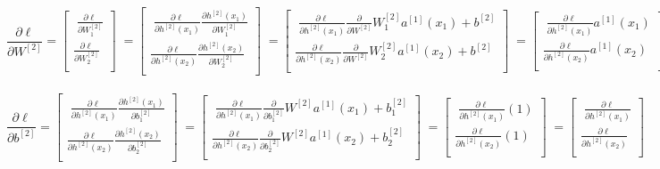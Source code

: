 \documentclass{article}
\begin{document}
\begin{itemize}
{$$
\frac{\partial \ell}{\partial W^{[2]}} = 
\begin{bmatrix} \;
\frac{\partial \ell}{\partial W_{1}^{[2]}} \\
\frac{\partial \ell}{\partial W_{2}^{[2]}} \\
\end{bmatrix} \;
= 
\begin{bmatrix} \;
\frac{\partial \ell}{\partial h^{[2]}(x_1)} \frac{\partial h^{[2]}(x_1)}{\partial W_{1}^{[2]}} \\
\frac{\partial \ell}{\partial h^{[2]}(x_2)} \frac{\partial h^{[2]}(x_2)}{\partial W_{2}^{[2]}} \\
\end{bmatrix} \;
= 
\begin{bmatrix} \;
\frac{\partial \ell}{\partial h^{[2]}(x_1)} \frac{\partial}{\partial W^{[2]}} W_{1}^{[2]}a^{[1]}(x_1) + b^{[2]} \\
\frac{\partial \ell}{\partial h^{[2]}(x_2)} \frac{\partial}{\partial W^{[2]}} W_{2}^{[2]}a^{[1]}(x_2) + b^{[2]} \\
\end{bmatrix} \;
= 
\begin{bmatrix} \;
\frac{\partial \ell}{\partial h^{[2]}(x_1)} a^{[1]}(x_1) \\
\frac{\partial \ell}{\partial h^{[2]}(x_2)} a^{[1]}(x_2) \\
\end{bmatrix} \;
$$
\\
$$
\frac{\partial \ell}{\partial b^{[2]}}
=
\begin{bmatrix} \;
\frac{\partial \ell}{\partial h^{[2]}(x_1)} \frac{\partial h^{[2]}(x_1)}{\partial b_1^{[2]}} \\
\frac{\partial \ell}{\partial h^{[2]}(x_2)} \frac{\partial h^{[2]}(x_2)}{\partial b_2^{[2]}}  \\
\end{bmatrix} \;
=
\begin{bmatrix} \;
\frac{\partial \ell}{\partial h^{[2]}(x_1)} \frac{\partial}{\partial b_1^{[2]}} W^{[2]}a^{[1]}(x_1) + b_1^{[2]} \\
\frac{\partial \ell}{\partial h^{[2]}(x_2)} \frac{\partial}{\partial b_2^{[2]}} W^{[2]}a^{[1]}(x_2) + b_2^{[2]} \\
\end{bmatrix} \;
=
\begin{bmatrix} \;
\frac{\partial \ell}{\partial h^{[2]}(x_1)} (1) \\
\frac{\partial \ell}{\partial h^{[2]}(x_2)} (1) \\
\end{bmatrix} \;
=
\begin{bmatrix} \;
\frac{\partial \ell}{\partial h^{[2]}(x_1)} \\
\frac{\partial \ell}{\partial h^{[2]}(x_2)} \\
\end{bmatrix} \;
$$

}
\end{itemize}
\end{document}
